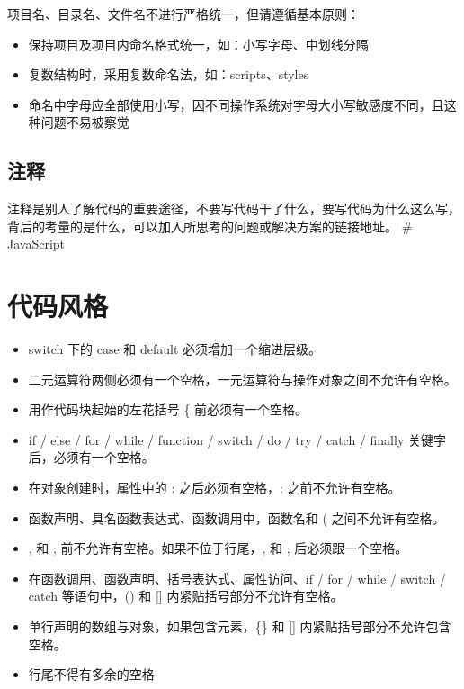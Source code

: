 \documentclass[]{report}
\providecommand{\tightlist}{%
  \setlength{\itemsep}{0pt}\setlength{\parskip}{0pt}}
\begin{document}
项目名、目录名、文件名不进行严格统一，但请遵循基本原则：

\begin{itemize}
\tightlist
\item
  保持项目及项目内命名格式统一，如：小写字母、中划线分隔
\item
  复数结构时，采用复数命名法，如：scripts、styles
\item
  命名中字母应全部使用小写，因不同操作系统对字母大小写敏感度不同，且这种问题不易被察觉
\end{itemize}

\hypertarget{ux6ce8ux91ca}{%
\subsection{注释}\label{ux6ce8ux91ca}}

注释是别人了解代码的重要途径，不要写代码干了什么，要写代码为什么这么写，背后的考量的是什么，可以加入所思考的问题或解决方案的链接地址。
\# JavaScript

\hypertarget{ux4ee3ux7801ux98ceux683c}{%
\section{代码风格}\label{ux4ee3ux7801ux98ceux683c}}

\begin{itemize}
\tightlist
\item
  switch 下的 case 和 default 必须增加一个缩进层级。
\item
  二元运算符两侧必须有一个空格，一元运算符与操作对象之间不允许有空格。
\item
  用作代码块起始的左花括号 \{ 前必须有一个空格。
\item
  if / else / for / while / function / switch / do / try / catch /
  finally 关键字后，必须有一个空格。
\item
  在对象创建时，属性中的 : 之后必须有空格，: 之前不允许有空格。
\item
  函数声明、具名函数表达式、函数调用中，函数名和 ( 之间不允许有空格。
\item
  , 和 ; 前不允许有空格。如果不位于行尾，, 和 ; 后必须跟一个空格。
\item
  在函数调用、函数声明、括号表达式、属性访问、if / for / while / switch
  / catch 等语句中，() 和 {[}{]} 内紧贴括号部分不允许有空格。
\item
  单行声明的数组与对象，如果包含元素，\{\} 和 {[}{]}
  内紧贴括号部分不允许包含空格。
\item
  行尾不得有多余的空格
\end{itemize}
\end{document}
